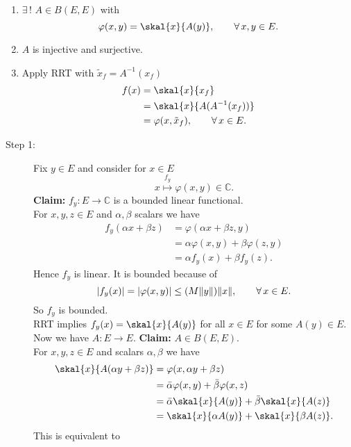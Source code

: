 \begin{beweis}
	\begin{enumerate}[Step 1:]
		\item $\exists\,!$ $A \in B(E,E)$ with
		\[
			\varphi(x,y)= \skal{x}{A(y)}, \qquad \forall\, x,y \in E.
		\]
		\item $A$ is injective and surjective.
		\item Apply RRT with $ \tilde x_f = A^{-1}(x_f)$
		\begin{align*}
			f(x) &= \skal{x}{x_f} \\ &= \skal{x}{A(A^{-1}(x_f))} \\ &= \varphi(x, \tilde x_f), \qquad \forall\, x \in E.
		\end{align*}
	\end{enumerate}
	\begin{description}
		\item[Step 1:] Fix $y \in E$ and consider for $x \in E$
		\[
			x \stackrel{f_y}{\mapsto } \varphi(x,y) \in \mathbb{C}.
		\] 
		\textbf{Claim:} \text{    }$f_y: E \to \mathbb{C}$ is a bounded linear functional. \\
		For $x,y,z \in E$ and $\alpha,\beta$ scalars we have
		\begin{align*}
			f_y(\alpha x+ \beta z) &= \varphi(\alpha x + \beta z,y) \\
			&= \alpha \varphi(x,y) + \beta \varphi(z,y) \\
			&= \alpha f_y(x) + \beta f_y(z).
		\end{align*}
		Hence $f_y$ is linear. It is bounded because of
		\[
			\abs{f_y(x)} = \abs{\varphi(x,y)} \leq (M \norm{y})\norm{x}, \qquad \forall\, x \in E.
		\]
		So $f_y$ is bounded. \\
		RRT implies $f_y(x) = \skal{x}{A(y)}$ for all $x \in E$ for some $A(y) \in E$. \\ Now we have $A : E \to E$.
		\textbf{Claim:} \text{    }$A \in B(E,E)$. \\
		For $x,y,z \in E$ and scalars $\alpha, \beta$ we have
		\begin{align*}
			\skal{x}{A( \alpha y + \beta z)} &= \varphi(x, \alpha y + \beta z) \\
			&= \bar{\alpha} \varphi(x,y)+ \bar{\beta} \varphi(x,z) \\
			&= \bar{\alpha} \skal{x}{A(y)} + \bar{\beta} \skal{x}{A(z)} \\
			&= \skal{x}{\alpha A(y)}+ \skal{x}{\beta A(z)}. \\
		\end{align*}
		This is equivalent to

\end{description}
\end{beweis}

